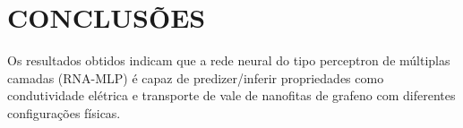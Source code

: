 \documentclass[a4paper,12pt]{article}
\begin{document}

	\section{CONCLUSÕES}

Os resultados obtidos indicam que a rede neural do tipo perceptron de múltiplas camadas (RNA-MLP) é capaz de predizer/inferir propriedades como condutividade elétrica e transporte de vale de nanofitas de grafeno com diferentes configurações físicas.




% 		

		
		
\end{document}
